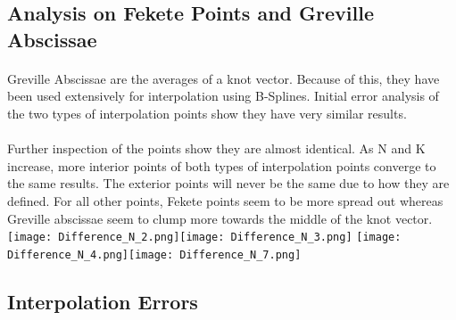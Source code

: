 \documentclass{article}
\begin{document}
\subsection*{Analysis on Fekete Points and Greville Abscissae}
\paragraph{}
Greville Abscissae are the averages of a knot vector. Because of this, they have been used extensively for interpolation using B-Splines. Initial error analysis of the two types of interpolation points show they have very similar results.
\paragraph{}
Further inspection of the points show they are almost identical. As N and K increase, more interior points of both types of interpolation points converge to the same results. The exterior points will never be the same due to how they are defined. For all other points, Fekete points seem to be more spread out whereas Greville abscissae seem to clump more towards the middle of the knot vector.
\hspace*{-2cm}\texttt{[image: Difference\_N\_2.png]}\texttt{[image: Difference\_N\_3.png]}
\hspace*{-2cm}\texttt{[image: Difference\_N\_4.png]}\texttt{[image: Difference\_N\_7.png]}
\subsection*{Interpolation Errors}
\end{document}
